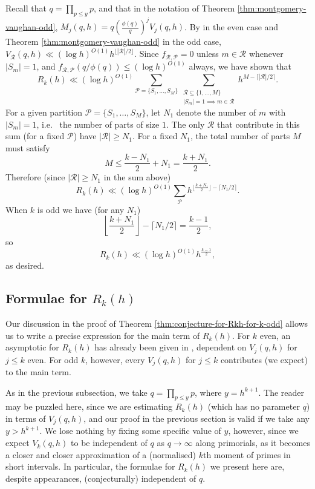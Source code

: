 \documentclass[11pt,letterpaper]{amsart}
\newcommand{\abs}[1]{\left\lvert #1\right\rvert}
\theoremstyle{definition}
\begin{document}
Recall that $q = \prod_{p \le y} p$, and that in the notation of Theorem \ref{thm:montgomery-vaughan-odd}, $M_j(q,h) = q\left(\frac{\phi(q)}{q}\right)^j V_j(q,h)$. By \cite{MV86} in the even case and Theorem \ref{thm:montgomery-vaughan-odd} in the odd case, $V_{\mathcal R}(q,h) \ll (\log h)^{O(1)} h^{\lfloor \abs{\mathcal{R}}/2\rfloor}$. Since $f_{\mathcal{R},\mathcal{P}} = 0$ unless $m\in \mathcal{R}$ whenever $\abs{S_m}=1$, and $f_{\mathcal{R},\mathcal{P}}(q/\phi(q))\leq (\log h)^{O(1)}$ always, we have shown that
\[R_k(h) \ll  (\log h)^{O(1)}\sum_{\mathcal P = \{S_1, \dots, S_M\}} \sum_{\substack{\mathcal R \subseteq \{1, \dots, M\}\\ \abs{S_m}=1\implies m\in \mathcal{R}}}  h^{M-\lceil|\mathcal R|/2\rceil}.\]
For a given partition $\mathcal P = \{S_1, \dots, S_M\}$, let $N_1$ denote the number of $m$ with $|S_m| = 1$, i.e.~ the number of parts of size $1$. The only $\mathcal R$ that contribute in this sum (for a fixed $\mathcal{P}$) have $|\mathcal R| \ge N_1$. For a fixed $N_1$, the total number of parts $M$ must satisfy
\begin{equation*}
M \le \frac{k-N_1}{2} + N_1 = \frac{k+N_1}{2}.
\end{equation*}
Therefore (since $\abs{\mathcal{R}}\geq N_1$ in the sum above)
\[R_k(h) \ll  (\log h)^{O(1)}\sum_{\mathcal P} h^{\lfloor\frac{k+N_1}{2}\rfloor-\lceil N_1/2\rceil}.\]
When $k$ is odd we have (for any $N_1$)
\[\left\lfloor\frac{k+N_1}{2}\right\rfloor-\lceil N_1/2\rceil= \frac{k-1}{2},\]
so
\[R_k(h) \ll (\log h)^{O(1)} h^{\frac{k-1}{2}}, \]
as desired.

\subsection{Formulae for $R_k(h)$}\label{subsec-rkformulae}

Our discussion in the proof of Theorem \ref{thm:conjecture-for-Rkh-for-k-odd} allows us to write a precise expression for the main term of $R_k(h)$. For $k$ even, an asymptotic for $R_k(h)$ has already been given in \cite{MS04}, dependent on $V_j(q,h)$ for $j \le k$ even. For odd $k$, however, every $V_j(q,h)$ for $j \le k$ contributes (we expect) to the main term.

As in the previous subsection, we take $q=\prod_{p \le y}p$, where $y=h^{k+1}$. The reader may be puzzled here, since we are estimating $R_k(h)$ (which has no parameter $q$) in terms of $V_j(q,h)$, and our proof in the previous section is valid if we take any $y>h^{k+1}$. We lose nothing by fixing some specific value of $y$, however, since we expect $V_k(q,h)$ to be independent of $q$ as $q \to \infty$ along primorials, as it becomes a closer and closer approximation of a (normalised) $k$th moment of primes in short intervals. In particular, the formulae for $R_k(h)$ we present here are, despite appearances, (conjecturally) independent of $q$.
\end{document}
